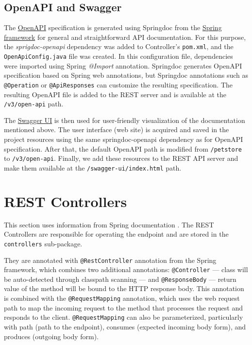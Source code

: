 \subsection{OpenAPI and Swagger}
The \hyperref[sec:openapi]{OpenAPI} specification is generated using Springdoc from the \hyperref[sec:spring]{Spring framework} for general and straightforward API documentation.
For this purpose, the \emph{sprigdoc-openapi} dependency was added to Controller's \texttt{pom.xml}, and the \texttt{OpenApiConfig.java} file was created. In this configuration file, dependencies were imported using Spring \emph{@Import} annotation.
Springdoc generates OpenAPI specification based on Spring web annotations, but Springdoc annotations such as \texttt{@Operation} or \texttt{@ApiResponses} can customize the resulting specification.
The resulting OpenAPI file is added to the REST server and is available at the \texttt{/v3/open-api} path. \cite{springdoc}

The \hyperref[sec:swagger]{Swagger UI} is then used for user-friendly visualization of the documentation mentioned above.
The user interface (web site) is acquired and saved in the project resources using the same springdoc-openapi dependency as for OpenAPI specification. After that, the default OpenAPI path is modified from \texttt{/petstore} to \texttt{/v3/open-api}. Finally, we add these resources to the REST API server and make them available at the  \texttt{/swagger-ui/index.html} path.

\section{REST Controllers}
This section uses information from Spring documentation \cite{springdocumentation}.
The REST Controllers are responsible for operating the endpoint and are stored in the \texttt{controllers} sub-package.

They are annotated with \texttt{@RestController} annotation from the Spring framework, which combines two additional annotations: \texttt{@Controller} --- class will be auto-detected through classpath scanning --- and \texttt{@ResponseBody} --- return value of the method will be bound to the HTTP response body.
This annotation is combined with the \texttt{@RequestMapping} annotation, which uses the web request path to map the incoming request to the method that processes the request and responds to the client. \texttt{@RequestMapping} can also be parameterized, particularly with path (path to the endpoint), consumes (expected incoming body form), and produces (outgoing body form).

